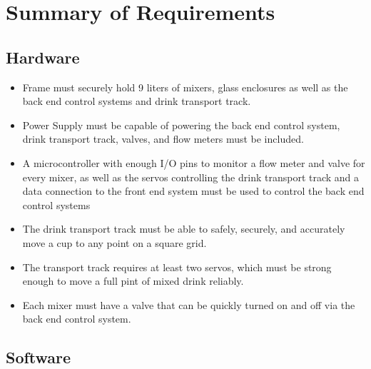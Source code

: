 \chapter{Summary of Requirements}
{
    \renewcommand*{\theenumi}{\thesubsection.\arabic{enumi}}
    \renewcommand*{\theenumii}{\theenumi.\arabic{enumii}}
    \renewcommand*{\theenumiii}{\theenumii.\arabic{enumiii}}

    \section{Hardware}
    
    \begin{itemize}
		\item Frame must securely hold 9 liters of mixers, glass enclosures 
        as well as the back end control systems and drink transport track.
		\item Power Supply must be capable of powering the back end control 
        system, drink transport track, valves, and flow meters must be included.
		\item A microcontroller with enough I/O pins to monitor a flow meter 
        and valve for every mixer, as well as the servos controlling the 
        drink transport track and a data connection to the front end system 
        must be used to control the back end control systems
		\item The drink transport track must be able to safely, securely, 
        and accurately move a cup to any point on a square grid.
		\item The transport track requires at least two servos, which must 
        be strong enough to move a full pint of mixed drink reliably.
		\item Each mixer must have a valve that can be quickly turned on and 
        off via the back end control system.
    \end{itemize}

    \section{Software}

}
